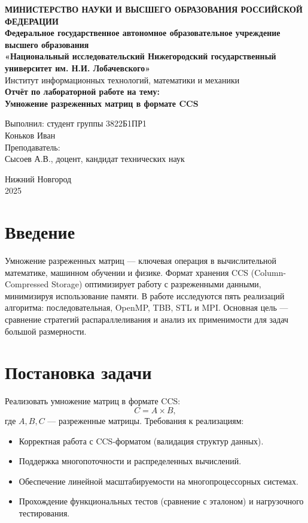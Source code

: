 \documentclass[a4paper,12pt]{article}
\begin{document}
\begin{titlepage}
\begin{center}
\textbf{МИНИСТЕРСТВО НАУКИ И ВЫСШЕГО ОБРАЗОВАНИЯ РОССИЙСКОЙ ФЕДЕРАЦИИ} \\[0.5cm]
\textbf{Федеральное государственное автономное образовательное учреждение высшего образования} \\[0.5cm]
\textbf{«Национальный исследовательский Нижегородский государственный университет им. Н.И. Лобачевского»} \\[0.5cm]
Институт информационных технологий, математики и механики \\
\vfill
{\Large
\textbf{Отчёт по лабораторной работе на тему:} \\[0.5cm]
\textbf{Умножение разреженных матриц в формате CCS} \\
}
\vfill
\begin{flushright}
Выполнил: студент группы 3822Б1ПР1 \\
Коньков Иван \\
\vspace{1cm}
Преподаватель: \\
Сысоев А.В., доцент, кандидат технических наук \\
\end{flushright}
\vfill
Нижний Новгород \\
2025
\end{center}
\end{titlepage}

\tableofcontents
\newpage

\section{Введение}
Умножение разреженных матриц — ключевая операция в вычислительной математике, машинном обучении и физике. Формат хранения CCS (Column-Compressed Storage) оптимизирует работу с разреженными данными, минимизируя использование памяти. В работе исследуются пять реализаций алгоритма: последовательная, OpenMP, TBB, STL и MPI. Основная цель — сравнение стратегий распараллеливания и анализ их применимости для задач большой размерности.

\section{Постановка задачи}
Реализовать умножение матриц в формате CCS:
\[
C = A \times B,
\]
где \( A, B, C \) — разреженные матрицы. Требования к реализациям:
\begin{itemize}
\item Корректная работа с CCS-форматом (валидация структур данных).
\item Поддержка многопоточности и распределенных вычислений.
\item Обеспечение линейной масштабируемости на многопроцессорных системах.
\item Прохождение функциональных тестов (сравнение с эталоном) и нагрузочного тестирования.
\end{itemize}
\end{document}
